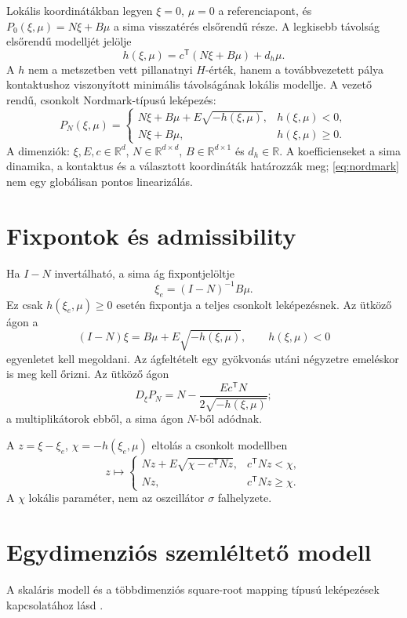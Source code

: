 Lokális koordinátákban legyen $\xi=0$, $\mu=0$ a referenciapont, és $P_0(\xi,\mu)=N\xi+B\mu$ a sima visszatérés elsőrendű része. A legkisebb távolság elsőrendű modelljét jelölje
\[
h(\xi,\mu)=c^\mathsf T(N\xi+B\mu)+d_h\mu.
\]
A $h$ nem a metszetben vett pillanatnyi $H$-érték, hanem a továbbvezetett pálya kontaktushoz viszonyított minimális távolságának lokális modellje. A vezető rendű, csonkolt Nordmark-típusú leképezés:
\begin{equation}\label{eq:nordmark}
P_N(\xi,\mu)=\begin{cases}
N\xi+B\mu+E\sqrt{-h(\xi,\mu)},& h(\xi,\mu)<0,\\
N\xi+B\mu,& h(\xi,\mu)\geq0.
\end{cases}
\end{equation}
A dimenziók: $\xi,E,c\in\mathbb R^d$, $N\in\mathbb R^{d\times d}$, $B\in\mathbb R^{d\times1}$ és $d_h\in\mathbb R$. A koefficienseket a sima dinamika, a kontaktus és a választott koordináták határozzák meg; \eqref{eq:nordmark} nem egy globálisan pontos linearizálás.

\section{Fixpontok és admissibility}
Ha $I-N$ invertálható, a sima ág fixpontjelöltje
\[
\xi_e=(I-N)^{-1}B\mu.
\]
Ez csak $h(\xi_e,\mu)\geq0$ esetén fixpontja a teljes csonkolt leképezésnek. Az ütköző ágon a
\[
(I-N)\xi=B\mu+E\sqrt{-h(\xi,\mu)},\qquad h(\xi,\mu)<0
\]
egyenletet kell megoldani. Az ágfeltételt egy gyökvonás utáni négyzetre emeléskor is meg kell őrizni. Az ütköző ágon
\[
D_\xi P_N=N-\frac{E c^\mathsf TN}{2\sqrt{-h(\xi,\mu)}};
\]
a multiplikátorok ebből, a sima ágon $N$-ből adódnak.

A $z=\xi-\xi_e$, $\chi=-h(\xi_e,\mu)$ eltolás a csonkolt modellben
\[
z\mapsto\begin{cases}
Nz+E\sqrt{\chi-c^\mathsf TNz},&c^\mathsf TNz<\chi,\\
Nz,&c^\mathsf TNz\geq\chi.
\end{cases}
\]
A $\chi$ lokális paraméter, nem az oszcillátor $\sigma$ falhelyzete.

\section{Egydimenziós szemléltető modell}
\examplebody

A skaláris modell és a többdimenziós square-root mapping típusú leképezések kapcsolatához lásd \cite[1.4.2. és 4.3. szakasz]{dib}.


